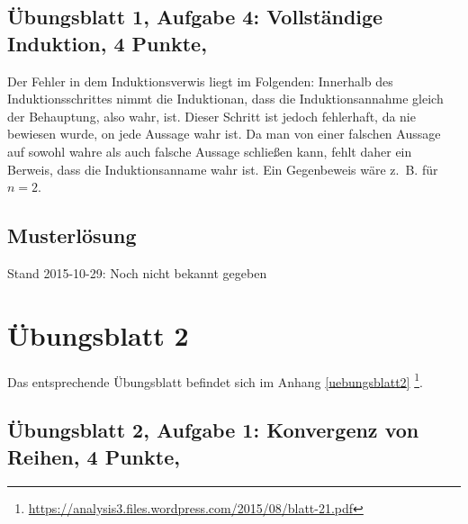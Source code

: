\documentclass[12pt,a4paper]{report}
\begin{document}
\newpage
\section{Übungsblatt 1, Aufgabe 4: Vollständige Induktion, 4 Punkte, \GruppeA}
Der Fehler in dem Induktionsverwis liegt im Folgenden: Innerhalb des Induktionsschrittes nimmt die Induktionan, dass die Induktionsannahme gleich der Behauptung, also wahr, ist. Dieser Schritt ist jedoch fehlerhaft, da nie bewiesen wurde, on jede Aussage wahr ist. Da man von einer falschen Aussage auf sowohl wahre als auch falsche Aussage schließen kann, fehlt daher ein Berweis, dass die Induktionsanname wahr ist. Ein Gegenbeweis wäre z.~B. für $n=2$.

\newpage
\section{Musterlösung}

Stand 2015-10-29: Noch nicht bekannt gegeben

\chapter*{Übungsblatt 2}

	Das entsprechende Übungsblatt befindet sich im Anhang \ref{uebungsblatt2} \footnote{\href{https://analysis3.files.wordpress.com/2015/08/blatt-2.pdf}{https://analysis3.files.wordpress.com/2015/08/blatt-21.pdf}}.
	
	\newpage		
	\section{Übungsblatt 2, Aufgabe 1: Konvergenz von Reihen, 4 Punkte, \GruppeA}
	
\end{document}
